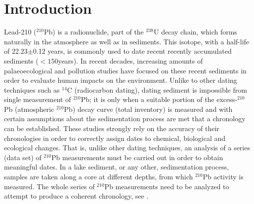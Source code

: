\documentclass [10pt] {article}
\begin{document}
\section{Introduction}

Lead-210 ($^{210}$Pb) is a radionuclide, part of the $^{238}$U decay chain, which forms naturally in the atmosphere as well as in sediments.
This isotope, with a half-life of 22.23$\pm$0.12 years, is commonly used to date recent recently accumulated sediments ($<150$years). 
In recent decades, increasing amounts of palaeoecological and pollution studies have focused on these recent sediments \citep[e.g.,][]{Courtney2019} in order to evaluate human impacts on the environment.
Unlike to other dating techniques such as $^{14}$C (radiocarbon dating), dating sediment is impossible from single measurement of $^{210}$Pb; it is only when a suitable portion of the excess-$^{210}$Pb (atmospheric $^{210}$Pb) decay curve (total inventory) is measured and with certain assumptions about the sedimentation process are met that a chronology can be established.  
These studies strongly rely on the accuracy of their chronologies in order to correctly assign dates to chemical, biological and ecological changes.
That is, unlike other dating techniques, an analysis of a series (data set) of $^{210}$Pb measurements must be carried out in order to obtain meaningful dates.  In a lake sediment, or any other, sedimentation process, samples are taken along a core at different depths, from which $^{210}$Pb activity is measured.  
The whole series of $^{210}$Pb measurements need to be analyzed to attempt to produce a coherent chronology, see \citet{Aquino2018}.
\end{document}
